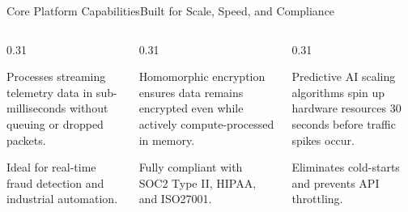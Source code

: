 \documentclass[aspectratio=169,10pt]{beamer}
\begin{document}
\begin{frame}{Core Platform Capabilities}{Built for Scale, Speed, and Compliance}
  \begin{columns}[T]
    \begin{column}{0.31\textwidth}
      \begin{tcolorbox}[cyancard, title={\scriptsize\faLayerGroup\ Stream Processing}]
        \scriptsize
        Processes streaming telemetry data in sub-milliseconds without queuing or dropped packets.
        \par\vspace*{0.1cm}
        Ideal for real-time fraud detection and industrial automation.
      \end{tcolorbox}
    \end{column}
    
    \begin{column}{0.31\textwidth}
      \begin{tcolorbox}[purplecard, title={\scriptsize\faLock\ Zero-Trust Encryption}]
        \scriptsize
        Homomorphic encryption ensures data remains encrypted even while actively compute-processed in memory.
        \par\vspace*{0.1cm}
        Fully compliant with SOC2 Type II, HIPAA, and ISO27001.
      \end{tcolorbox}
    \end{column}
    
    \begin{column}{0.31\textwidth}
      \begin{tcolorbox}[emeraldcard, title={\scriptsize\faCogs\ Adaptive Scaling}]
        \scriptsize
        Predictive AI scaling algorithms spin up hardware resources 30 seconds before traffic spikes occur.
        \par\vspace*{0.1cm}
        Eliminates cold-starts and prevents API throttling.
      \end{tcolorbox}
    \end{column}
  \end{columns}
\end{frame}
\end{document}
